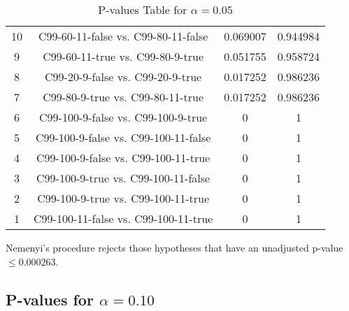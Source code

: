 \documentclass[a4paper,10pt]{article}
\begin{document}
\begin{landscape}
\begin{table}[!htp]
\begin{tabular}{cccc}
10&C99-60-11-false vs. C99-80-11-false&0.069007&0.944984\\
9&C99-60-11-true vs. C99-80-9-true&0.051755&0.958724\\
8&C99-20-9-false vs. C99-20-9-true&0.017252&0.986236\\
7&C99-80-9-true vs. C99-80-11-true&0.017252&0.986236\\
6&C99-100-9-false vs. C99-100-9-true&0&1\\
5&C99-100-9-false vs. C99-100-11-false&0&1\\
4&C99-100-9-false vs. C99-100-11-true&0&1\\
3&C99-100-9-true vs. C99-100-11-false&0&1\\
2&C99-100-9-true vs. C99-100-11-true&0&1\\
1&C99-100-11-false vs. C99-100-11-true&0&1\\
\hline
\end{tabular}
\caption{P-values Table for $\alpha=0.05$}
\end{table}Nemenyi's procedure rejects those hypotheses that have an unadjusted p-value $\le0.000263$.

\pagebreak

\subsection{P-values for $\alpha=0.10$}


\end{landscape}
\end{document}
